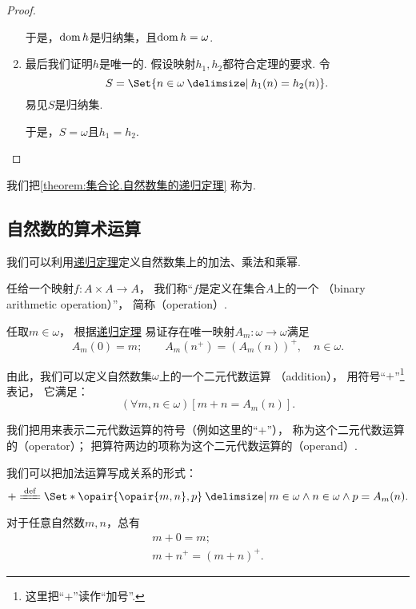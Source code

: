 \begin{theorem}[递归定理]
\begin{proof}
\begin{enumerate}
	于是，\(\operatorname{dom} h\)是归纳集，且\(\operatorname{dom} h = \omega\).

	\item 最后我们证明\(h\)是唯一的.
	假设映射\(h_1,h_2\)都符合定理的要求.
	令\[
		S = \Set{ n \in \omega \given h_1(n) = h_2(n) }.
	\]
	易见\(S\)是归纳集.

	于是，\(S = \omega\)且\(h_1 = h_2\).
	\qedhere
\end{enumerate}
\end{proof}
\end{theorem}
我们把\cref{theorem:集合论.自然数集的递归定理} 称为.

\subsection{自然数的算术运算}
我们可以利用\hyperref[theorem:集合论.自然数集的递归定理]{递归定理}定义自然数集上的加法、乘法和乘幂.

\begin{definition}\label{definition:集合论.二元代数运算}
任给一个映射\(f\colon A \times A \to A\)，
我们称“\(f\)是定义在集合\(A\)上的一个%
（binary arithmetic operation）”，
简称（operation）.
\end{definition}

任取\(m \in \omega\)，
根据\hyperref[theorem:集合论.自然数集的递归定理]{递归定理}%
易证存在唯一映射\(A_m\colon \omega \to \omega\)满足\[
	A_m(0) = m; \qquad
	A_m(n^+) = (A_m(n))^+, \quad n \in \omega.
\]

由此，我们可以定义自然数集\(\omega\)上的一个二元代数运算%
（addition），
用符号“\(+\)”\footnote{%
这里把“\(+\)”读作“加号”.
}表记，
它满足：\[
	(\forall m,n\in\omega)
	[m + n = A_m(n)].
\]

我们把用来表示二元代数运算的符号（例如这里的“\(+\)”），
称为这个二元代数运算的（operator）；
把算符两边的项称为这个二元代数运算的（operand）.

我们可以把加法运算写成关系的形式：\[
	+ \defeq \Set*{
		\opair{\opair{m,n},p}
		\given
		m \in \omega
		\land
		n \in \omega
		\land
		p = A_m(n)
	}.
\]

\begin{theorem}
对于任意自然数\(m,n\)，总有\begin{gather}
	m + 0 = m;
	\label{equation:集合论.自然数的加法.性质1} \\%
	m + n^+ = (m+n)^+.
	\label{equation:集合论.自然数的加法.性质2}%
\end{gather}
\end{theorem}


